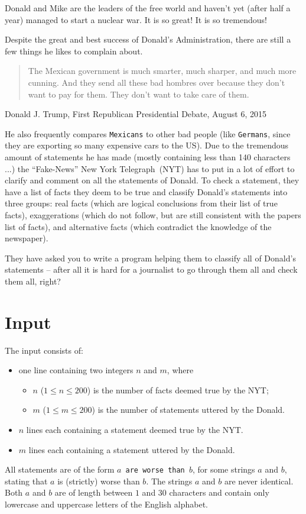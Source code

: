 Donald and Mike are the leaders of the free world and haven't yet (after half a year) managed to start a nuclear war.
It is so great!
It is so tremendous!

Despite the great and best success of Donald's Administration, there are still a few things he likes to complain about.
\begin{quote}
The Mexican government is much smarter, much sharper, and much more cunning.
And they send all these bad hombres over because they don't want to pay for them.
They don't want to take care of them.
\end{quote}
\begin{flushright}\vspace{-1em}
Donald J. Trump, First Republican Presidential Debate, August 6, 2015
\end{flushright}
He also frequently compares \texttt{Mexicans} to other bad people (like \texttt{Germans}, since they are exporting so many expensive cars to the US).
Due to the tremendous amount of statements he has made (mostly containing less than 140 characters ...) the ``Fake-News'' New York Telegraph~(NYT) has to put in a lot of effort to clarify and comment on all the statements of Donald.
To check a statement, they have a list of facts they deem to be true and classify Donald's statements into three groups: real facts (which are logical conclusions from their list of true facts), exaggerations (which do not follow, but are still consistent with the papers list of facts), and alternative facts (which contradict the knowledge of the newspaper).

They have asked you to write a program helping them to classify all of Donald's statements -- after all it is hard for a journalist to go through them all and check them all, right?

\section*{Input}
The input consists of:
\begin{itemize}
	\item one line containing two integers $n$ and $m$, where
		\begin{itemize}
			\item $n$ ($1 \leq n \leq 200$) is the number of facts deemed true by the NYT; 
			\item $m$ ($1 \leq m \leq 200$) is the number of statements uttered by the Donald.
		\end{itemize}
	\item $n$ lines each containing a statement deemed true by the NYT.
	\item $m$ lines each containing a statement uttered by the Donald.
\end{itemize}
All statements are of the form $a$\texttt{ are worse than }$b$, for some strings $a$ and $b$, stating that $a$ is (strictly) worse than $b$. The strings $a$ and $b$ are never identical.
Both $a$ and $b$ are of length between $1$ and $30$ characters and contain only lowercase and uppercase letters of the English alphabet.

